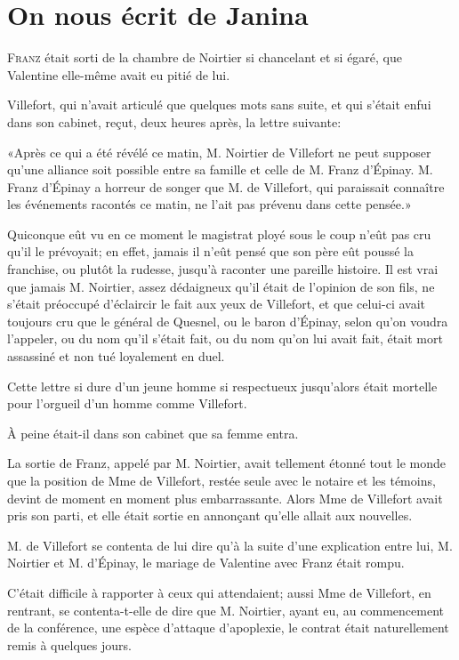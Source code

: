 \chapter{On nous écrit de Janina}

\lettrine{F}{ranz} était sorti de la chambre de Noirtier si chancelant et si égaré, que Valentine elle-même avait eu pitié de lui. 

\zz
Villefort, qui n'avait articulé que quelques mots sans suite, et qui s'était enfui dans son cabinet, reçut, deux heures après, la lettre suivante: 

«Après ce qui a été révélé ce matin, M. Noirtier de Villefort ne peut supposer qu'une alliance soit possible entre sa famille et celle de M. Franz d'Épinay. M. Franz d'Épinay a horreur de songer que M. de Villefort, qui paraissait connaître les événements racontés ce matin, ne l'ait pas prévenu dans cette pensée.» 

Quiconque eût vu en ce moment le magistrat ployé sous le coup n'eût pas cru qu'il le prévoyait; en effet, jamais il n'eût pensé que son père eût poussé la franchise, ou plutôt la rudesse, jusqu'à raconter une pareille histoire. Il est vrai que jamais M. Noirtier, assez dédaigneux qu'il était de l'opinion de son fils, ne s'était préoccupé d'éclaircir le fait aux yeux de Villefort, et que celui-ci avait toujours cru que le général de Quesnel, ou le baron d'Épinay, selon qu'on voudra l'appeler, ou du nom qu'il s'était fait, ou du nom qu'on lui avait fait, était mort assassiné et non tué loyalement en duel. 

Cette lettre si dure d'un jeune homme si respectueux jusqu'alors était mortelle pour l'orgueil d'un homme comme Villefort. 

À peine était-il dans son cabinet que sa femme entra. 

La sortie de Franz, appelé par M. Noirtier, avait tellement étonné tout le monde que la position de Mme de Villefort, restée seule avec le notaire et les témoins, devint de moment en moment plus embarrassante. Alors Mme de Villefort avait pris son parti, et elle était sortie en annonçant qu'elle allait aux nouvelles. 

M. de Villefort se contenta de lui dire qu'à la suite d'une explication entre lui, M. Noirtier et M. d'Épinay, le mariage de Valentine avec Franz était rompu. 

C'était difficile à rapporter à ceux qui attendaient; aussi Mme de Villefort, en rentrant, se contenta-t-elle de dire que M. Noirtier, ayant eu, au commencement de la conférence, une espèce d'attaque d'apoplexie, le contrat était naturellement remis à quelques jours. 

